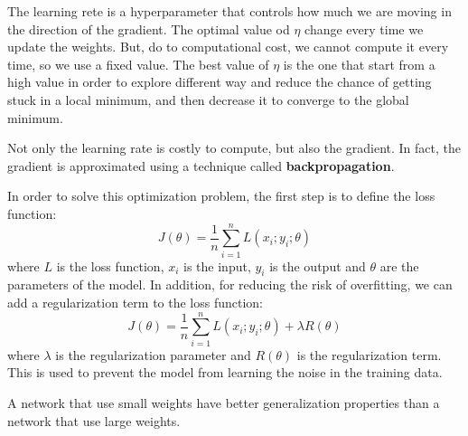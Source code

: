 The learning rete is a hyperparameter that controls how much we are moving in the
direction of the gradient. The optimal value od $\eta$ change every time we update
the weights. But, do to computational cost, we cannot compute it every time, so we
use a fixed value. The best value of $\eta$ is the one that start from a high value
in order to explore different way and reduce the chance of getting stuck in a local
minimum, and then decrease it to converge to the global minimum.

Not only the learning rate is costly to compute, but also the gradient. In fact,
the gradient is approximated using a technique called \textbf{backpropagation}.

In order to solve this optimization problem, the first step is to define the loss
function:
\begin{equation}
    J(\theta) = \frac{1}{n} \sum_{i=1}^n L(x_i; y_i; \theta)
\end{equation}
where $L$ is the loss function, $x_i$ is the input, $y_i$ is the output and $\theta$
are the parameters of the model. In addition, for reducing the risk of overfitting,
we can add a regularization term to the loss function:
\begin{equation}
    J(\theta) = \frac{1}{n} \sum_{i=1}^n L(x_i; y_i; \theta) + \lambda R(\theta)
\end{equation}
where $\lambda$ is the regularization parameter and $R(\theta)$ is the regularization
term. This is used to prevent the model from learning the noise in the training data.

\begin{note}
    A network that use small weights have better generalization properties than
    a network that use large weights.
\end{note}
